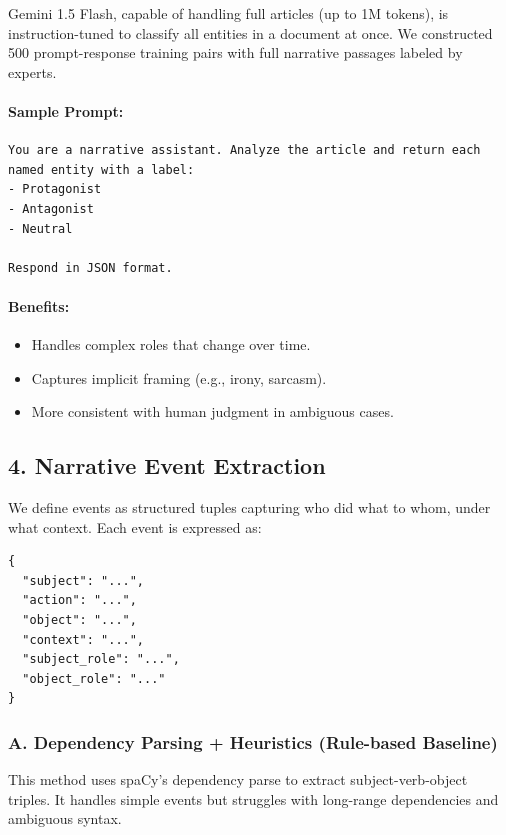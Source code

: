 \documentclass[12pt]{article}
\begin{document}
Gemini 1.5 Flash, capable of handling full articles (up to 1M tokens), is instruction-tuned to classify all entities in a document at once. We constructed 500 prompt-response training pairs with full narrative passages labeled by experts.

\paragraph{Sample Prompt:}

\begin{lstlisting}
You are a narrative assistant. Analyze the article and return each named entity with a label:
- Protagonist
- Antagonist
- Neutral

Respond in JSON format.
\end{lstlisting}

\paragraph{Benefits:}
\begin{itemize}
    \item Handles complex roles that change over time.
    \item Captures implicit framing (e.g., irony, sarcasm).
    \item More consistent with human judgment in ambiguous cases.
\end{itemize}

\subsection{4. Narrative Event Extraction}

We define events as structured tuples capturing who did what to whom, under what context. Each event is expressed as:

\begin{verbatim}
{
  "subject": "...",
  "action": "...",
  "object": "...",
  "context": "...",
  "subject_role": "...",
  "object_role": "..."
}
\end{verbatim}

\subsubsection{A. Dependency Parsing + Heuristics (Rule-based Baseline)}

This method uses spaCy’s dependency parse to extract subject-verb-object triples. It handles simple events but struggles with long-range dependencies and ambiguous syntax.
\end{document}
